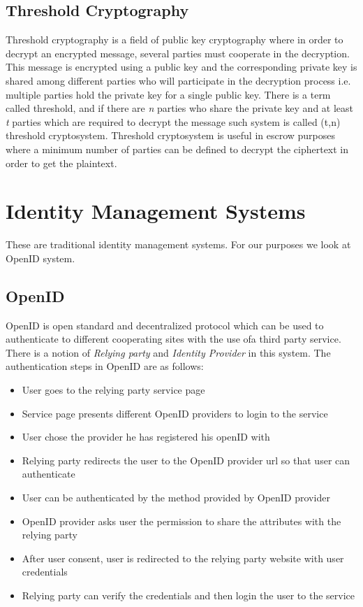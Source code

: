\subsection{Threshold Cryptography}
Threshold cryptography is a field of public key cryptography where in order to decrypt an encrypted message, several parties must cooperate in the decryption. This message is encrypted using a public key and the corresponding private key is shared among different parties who will participate in the decryption process i.e. multiple parties hold the private key for a single public key. There is a term called threshold, and if there are \textit{n} parties who share the private key and at least \textit{t} parties which are required to decrypt the message such system is called (t,n) threshold cryptosystem. Threshold cryptosystem is useful in escrow purposes where a minimum number of parties can be defined to decrypt the ciphertext in order to get the plaintext.

\section{Identity Management Systems}
These are traditional identity management systems. For our purposes we look at OpenID system.
\subsection{OpenID}
OpenID is open standard and decentralized protocol which can be used to authenticate to different cooperating sites with the use ofa third party service. There is a notion of \textit{Relying party} and \textit{Identity Provider} in this system. The authentication steps in OpenID are as follows:
\begin{itemize}
\item User goes to the relying party service page
\item Service page presents different OpenID providers to login to the service
\item User chose the provider he has registered his openID with
\item Relying party redirects the user to the OpenID provider url so that user can authenticate
\item User can be authenticated by the method provided by OpenID provider
\item OpenID provider asks user the permission to share the attributes with the relying party
\item After user consent, user is redirected to the relying party website with user credentials
\item Relying party can verify the credentials and then login the user to the service
\end{itemize}
